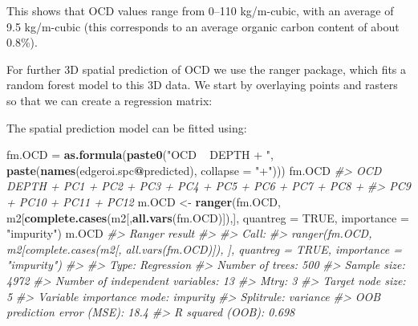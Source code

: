 \documentclass[graybox,natbib,nospthms,UStrade]{svmono}
\newenvironment{Shaded}{\begin{snugshade}}{\end{snugshade}}
\newcommand{\CommentTok}[1]{\textcolor[rgb]{0.37,0.37,0.37}{\textit{#1}}}
\newcommand{\DataTypeTok}[1]{\textcolor[rgb]{0.27,0.27,0.27}{#1}}
\newcommand{\KeywordTok}[1]{\textcolor[rgb]{0.27,0.27,0.27}{\textbf{#1}}}
\newcommand{\NormalTok}[1]{#1}
\newcommand{\OperatorTok}[1]{\textcolor[rgb]{0.43,0.43,0.43}{\textbf{#1}}}
\newcommand{\OtherTok}[1]{\textcolor[rgb]{0.37,0.37,0.37}{#1}}
\newcommand{\StringTok}[1]{\textcolor[rgb]{0.5,0.5,0.5}{#1}}
\begin{document}
This shows that OCD values range from 0--110 kg/m-cubic, with an average of 9.5 kg/m-cubic (this corresponds to an average organic carbon content of about 0.8\%).

For further 3D spatial prediction of OCD we use the ranger package, which fits a random forest model to this 3D data. We start by overlaying points and rasters so that we can create a regression matrix:

\begin{Shaded}
\end{Shaded}

The spatial prediction model can be fitted using:

\begin{Shaded}
\begin{Highlighting}[]
\NormalTok{fm.OCD =}\StringTok{ }\KeywordTok{as.formula}\NormalTok{(}\KeywordTok{paste0}\NormalTok{(}\StringTok{"OCD ~ DEPTH + "}\NormalTok{, }\KeywordTok{paste}\NormalTok{(}\KeywordTok{names}\NormalTok{(edgeroi.spc}\OperatorTok{@}\NormalTok{predicted), }
                                                   \DataTypeTok{collapse =} \StringTok{"+"}\NormalTok{)))}
\NormalTok{fm.OCD}
\CommentTok{#> OCD ~ DEPTH + PC1 + PC2 + PC3 + PC4 + PC5 + PC6 + PC7 + PC8 + }
\CommentTok{#>     PC9 + PC10 + PC11 + PC12}
\NormalTok{m.OCD <-}\StringTok{ }\KeywordTok{ranger}\NormalTok{(fm.OCD, m2[}\KeywordTok{complete.cases}\NormalTok{(m2[,}\KeywordTok{all.vars}\NormalTok{(fm.OCD)]),], }
                \DataTypeTok{quantreg =} \OtherTok{TRUE}\NormalTok{, }\DataTypeTok{importance =} \StringTok{"impurity"}\NormalTok{)}
\NormalTok{m.OCD}
\CommentTok{#> Ranger result}
\CommentTok{#> }
\CommentTok{#> Call:}
\CommentTok{#>  ranger(fm.OCD, m2[complete.cases(m2[, all.vars(fm.OCD)]), ],      quantreg = TRUE, importance = "impurity") }
\CommentTok{#> }
\CommentTok{#> Type:                             Regression }
\CommentTok{#> Number of trees:                  500 }
\CommentTok{#> Sample size:                      4972 }
\CommentTok{#> Number of independent variables:  13 }
\CommentTok{#> Mtry:                             3 }
\CommentTok{#> Target node size:                 5 }
\CommentTok{#> Variable importance mode:         impurity }
\CommentTok{#> Splitrule:                        variance }
\CommentTok{#> OOB prediction error (MSE):       18.4 }
\CommentTok{#> R squared (OOB):                  0.698}
\end{Highlighting}
\end{Shaded}
\end{document}
